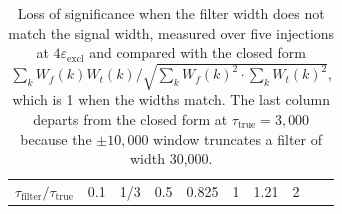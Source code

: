 \documentclass[
  11pt,
]{article}
\begin{document}
\begin{longtable}[]{@{}
  >{\raggedright\arraybackslash}p{}
  >{\raggedright\arraybackslash}p{}
  >{\raggedright\arraybackslash}p{}
  >{\raggedright\arraybackslash}p{}
  >{\raggedright\arraybackslash}p{}
  >{\raggedright\arraybackslash}p{}
  >{\raggedright\arraybackslash}p{}
  >{\raggedright\arraybackslash}p{}
  >{\raggedright\arraybackslash}p{}
  >{\raggedright\arraybackslash}p{}@{}}
\caption{Loss of significance when the filter width does not match the
signal width, measured over five injections at
\(4\varepsilon_{\mathrm{excl}}\) and compared with the closed form
\(\sum_k W_f(k)W_t(k)\big/\sqrt{\sum_k W_f(k)^2 \cdot \sum_k W_t(k)^2}\),
which is 1 when the widths match. The last column departs from the
closed form at \(\tau_{\mathrm{true}} = 3{,}000\) because the
\(\pm 10,000\) window truncates a filter of width
30,000.}\tabularnewline
\toprule\noalign{}
\begin{minipage}[b]{\linewidth}\raggedright
\(\tau_{\mathrm{filter}}/\tau_{\mathrm{true}}\)
\end{minipage} & \begin{minipage}[b]{\linewidth}\raggedright
0.1
\end{minipage} & \begin{minipage}[b]{\linewidth}\raggedright
1/3
\end{minipage} & \begin{minipage}[b]{\linewidth}\raggedright
0.5
\end{minipage} & \begin{minipage}[b]{\linewidth}\raggedright
0.825
\end{minipage} & \begin{minipage}[b]{\linewidth}\raggedright
1
\end{minipage} & \begin{minipage}[b]{\linewidth}\raggedright
1.21
\end{minipage} & \begin{minipage}[b]{\linewidth}\raggedright
2
\end{minipage} & \begin{minipage}[b]{\linewidth}\raggedright

\end{minipage}
\end{longtable}
\end{document}
